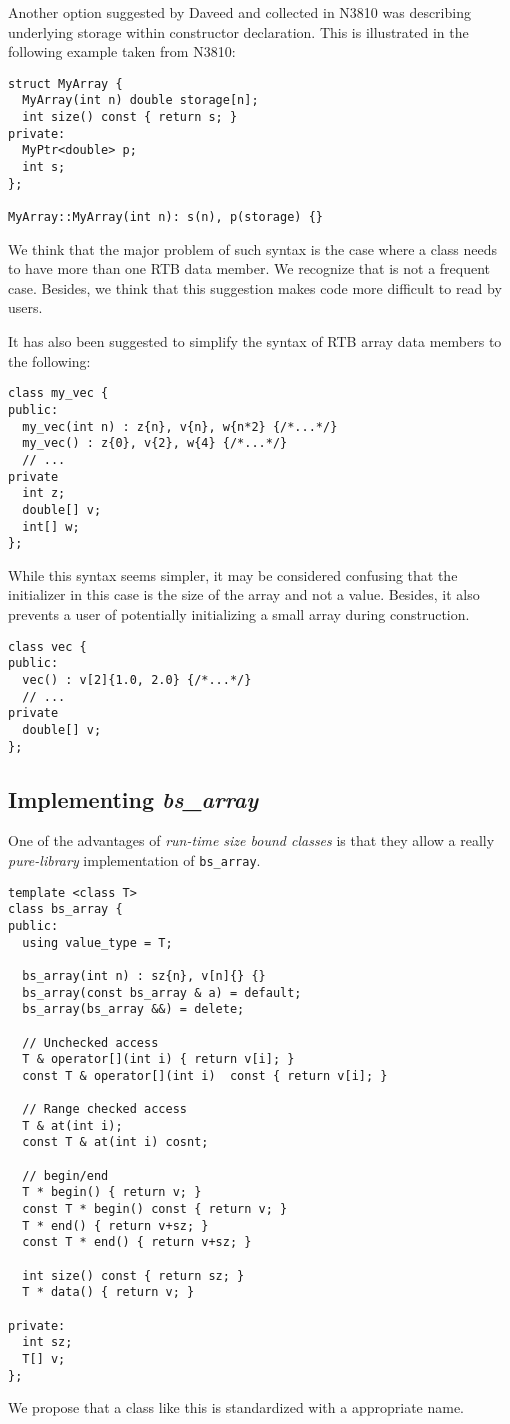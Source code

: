 Another option suggested by Daveed and collected in N3810 was describing
underlying storage within constructor declaration. This is illustrated in the
following example taken from N3810:

\begin{lstlisting}
struct MyArray {
  MyArray(int n) double storage[n];
  int size() const { return s; }
private:
  MyPtr<double> p;
  int s;
};

MyArray::MyArray(int n): s(n), p(storage) {}
\end{lstlisting}

We think that the major problem of such syntax is the case where a class needs
to have more than one RTB data member. We recognize that is not a frequent case.
Besides, we think that this suggestion makes code more difficult to read by
users.

It has also been suggested to simplify the syntax of RTB array data members to
the following:

\begin{lstlisting}
class my_vec {
public:
  my_vec(int n) : z{n}, v{n}, w{n*2} {/*...*/}
  my_vec() : z{0}, v{2}, w{4} {/*...*/}
  // ...
private
  int z;
  double[] v;
  int[] w;
};
\end{lstlisting}

While this syntax seems simpler, it may be considered confusing that the
initializer in this case is the size of the array and not a value. Besides, it
also prevents a user of potentially initializing a small array during
construction.

\begin{lstlisting}
class vec {
public:
  vec() : v[2]{1.0, 2.0} {/*...*/}
  // ...
private
  double[] v;
};
\end{lstlisting}

\subsection{Implementing \emph{bs\_array}}

One of the advantages of \emph{run-time size bound classes} is that they allow a
really \emph{pure-library} implementation of \verb+bs_array+.

\begin{lstlisting}
template <class T>
class bs_array {
public:
  using value_type = T;

  bs_array(int n) : sz{n}, v[n]{} {}
  bs_array(const bs_array & a) = default;
  bs_array(bs_array &&) = delete;

  // Unchecked access
  T & operator[](int i) { return v[i]; }
  const T & operator[](int i)  const { return v[i]; }

  // Range checked access
  T & at(int i);
  const T & at(int i) cosnt;

  // begin/end
  T * begin() { return v; }
  const T * begin() const { return v; }
  T * end() { return v+sz; }
  const T * end() { return v+sz; }

  int size() const { return sz; }
  T * data() { return v; }

private:
  int sz;
  T[] v;
};
\end{lstlisting}

We propose that a class like this is standardized with a appropriate name.
